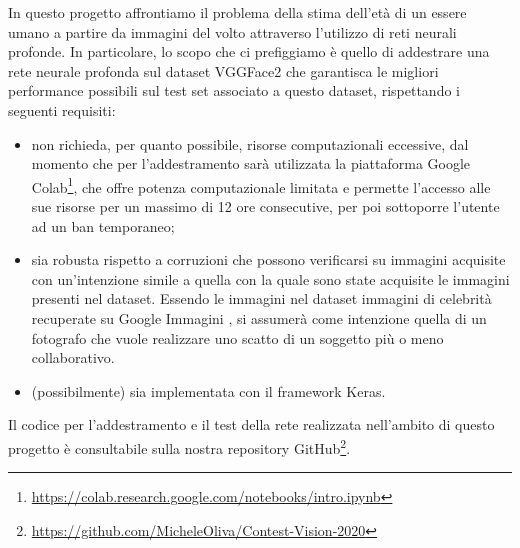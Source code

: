 In questo progetto affrontiamo il problema della stima dell'età di un essere umano a partire da immagini del volto attraverso l'utilizzo di reti neurali profonde. 
In particolare, lo scopo che ci prefiggiamo è quello di addestrare una rete neurale profonda sul dataset VGGFace2 \cite{vggface2dataset} che garantisca le migliori performance possibili sul test set associato a questo dataset, rispettando i seguenti requisiti:

\begin{itemize}
	\item non richieda, per quanto possibile, risorse computazionali eccessive, dal momento che per l'addestramento sarà utilizzata la piattaforma Google Colab\footnote{\url{https://colab.research.google.com/notebooks/intro.ipynb}}, che offre potenza computazionale limitata e permette l'accesso alle sue risorse per un massimo di 12 ore consecutive, per poi sottoporre l'utente ad un ban temporaneo; 
	\item sia robusta rispetto a corruzioni che possono verificarsi su immagini acquisite con un'intenzione simile a quella con la quale sono state acquisite le immagini presenti nel dataset.
Essendo le immagini nel dataset immagini di celebrità recuperate su Google Immagini \cite{vggface2dataset}, si assumerà come intenzione quella di un fotografo che vuole realizzare uno scatto di un soggetto più o meno collaborativo.
	\item (possibilmente) sia implementata con il framework Keras.
\end{itemize}

Il codice per l’addestramento e il test della rete realizzata nell’ambito di questo progetto è consultabile sulla nostra repository GitHub\footnote{\url{https://github.com/MicheleOliva/Contest-Vision-2020}}.